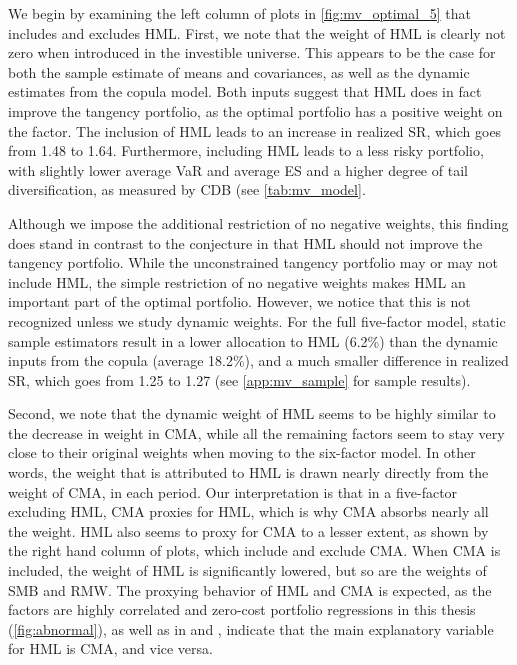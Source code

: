 We begin by examining the left column of plots in \autoref{fig:mv_optimal_5} that includes and excludes HML. First, we note that the weight of HML is clearly not zero when introduced in the investible universe. This appears to be the case for both the sample estimate of means and covariances, as well as the dynamic estimates from the copula model. Both inputs suggest that HML does in fact improve the tangency portfolio, as the optimal portfolio has a positive weight on the factor. The inclusion of HML leads to an increase in realized SR, which goes from 1.48 to 1.64. Furthermore, including HML leads to a less risky portfolio, with slightly lower average VaR and average ES and a higher degree of tail diversification, as measured by CDB (see \autoref{tab:mv_model}.

Although we impose the additional restriction of no negative weights, this finding does stand in contrast to the conjecture in \textcite{FF2015} that HML should not improve the tangency portfolio. While the unconstrained tangency portfolio may or may not include HML, the simple restriction of no negative weights makes HML an important part of the optimal portfolio. However, we notice that this is not recognized unless we study dynamic weights. For the full five-factor model, static sample estimators result in a lower allocation to HML (6.2\%) than the dynamic inputs from the copula (average 18.2\%), and a much smaller difference in realized SR, which goes from 1.25 to 1.27 (see \autoref{app:mv_sample} for sample results).

Second, we note that the dynamic weight of HML seems to be highly similar to the decrease in weight in CMA, while all the remaining factors seem to stay very close to their original weights when moving to the six-factor model. In other words, the weight that is attributed to HML is drawn nearly directly from the weight of CMA, in each period. Our interpretation is that in a five-factor excluding HML, CMA proxies for HML, which is why CMA absorbs nearly all the weight. HML also seems to proxy for CMA to a lesser extent, as shown by the right hand column of plots, which include and exclude CMA. When CMA is included, the weight of HML is significantly lowered, but so are the weights of SMB and RMW. The proxying behavior of HML and CMA is expected, as the factors are highly correlated and zero-cost portfolio regressions in this thesis (\autoref{fig:abnormal}), as well as in \textcite{FF2015} and \textcite{Asness2015}, indicate that the main explanatory variable for HML is CMA, and vice versa.

